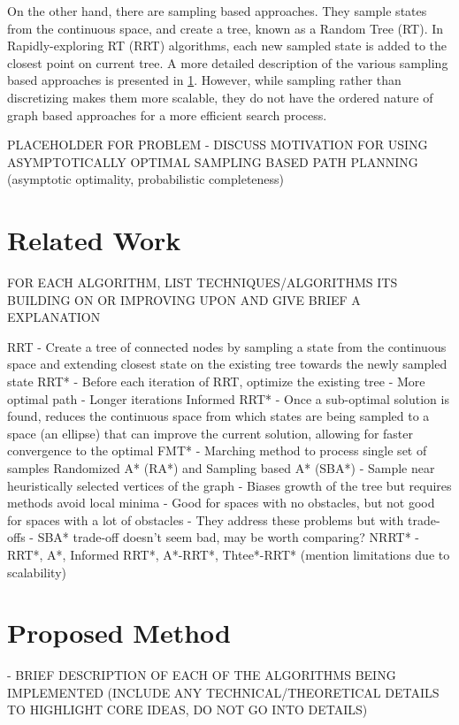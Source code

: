 \documentclass{article}
\begin{document}
    On the other hand, there are sampling based approaches. They sample states from the continuous space, and create a tree, known as a Random Tree (RT). In Rapidly-exploring RT (RRT) algorithms, each new sampled state is added to the closest point on current tree. A more detailed description of the various sampling based approaches is presented in \ref{sec:Related Work}. However, while sampling rather than discretizing makes them more scalable, they do not have the ordered nature of graph based approaches for a more efficient search process.
    
    PLACEHOLDER FOR PROBLEM - DISCUSS MOTIVATION FOR USING ASYMPTOTICALLY OPTIMAL SAMPLING BASED PATH PLANNING (asymptotic optimality, probabilistic completeness)

\section{Related Work}
\label{sec:Related Work}
    FOR EACH ALGORITHM, LIST TECHNIQUES/ALGORITHMS ITS BUILDING ON OR IMPROVING UPON AND GIVE BRIEF A EXPLANATION

    RRT
        - Create a tree of connected nodes by sampling a state from the continuous space and extending closest state on the existing tree towards the newly sampled state
    RRT*
        - Before each iteration of RRT, optimize the existing tree
        - More optimal path
        - Longer iterations
    Informed RRT*
        - Once a sub-optimal solution is found, reduces the continuous space from which states are being sampled to a space (an ellipse) that can improve the current solution, allowing for faster convergence to the optimal
    FMT*
        - Marching method to process single set of samples
    Randomized A* (RA*) and Sampling based A* (SBA*)
        - Sample near heuristically selected vertices of the graph
        - Biases growth of the tree but requires methods avoid local minima
        - Good for spaces with no obstacles, but not good for spaces with a lot of obstacles
            - They address these problems but with trade-offs
            - SBA* trade-off doesn’t seem bad, may be worth comparing?    
    NRRT*
        - RRT*, A*, Informed RRT*, A*-RRT*, Thtee*-RRT* (mention limitations due to scalability)
        

\section{Proposed Method}
\label{sec:Proposed Method}
    - BRIEF DESCRIPTION OF EACH OF THE ALGORITHMS BEING IMPLEMENTED (INCLUDE ANY TECHNICAL/THEORETICAL DETAILS TO HIGHLIGHT CORE IDEAS, DO NOT GO INTO DETAILS)	
\end{document}
